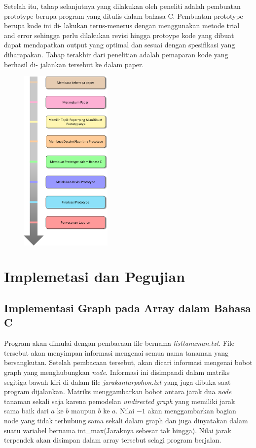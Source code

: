 \documentclass[conference]{IEEEtran}
\begin{document}
Setelah itu, tahap selanjutnya yang dilakukan oleh peneliti
adalah pembuatan prototype berupa program yang ditulis
dalam bahasa C. Pembuatan prototype berupa kode ini di-
lakukan terus-menerus dengan menggunakan metode trial and
error sehingga perlu dilakukan revisi hingga protoype kode
yang dibuat dapat mendapatkan output yang optimal dan
sesuai dengan spesifikasi yang diharapakan. Tahap terakhir
dari penelitian adalah pemaparan kode yang berhasil di-
jalankan tersebut ke dalam paper.
\begin{figure}[htbp]
\includegraphics[width=0.4\textwidth]{gambar1}
\centering
\end{figure}


\section{Implemetasi dan Pegujian}
\subsection{Implementasi Graph pada Array dalam Bahasa C}
Program akan dimulai dengan pembacaan file bernama \textit{listtanaman.txt}. File tersebut akan menyimpan
informasi mengenai semua nama tanaman yang bersangkutan. Setelah pembacaan tersebut,
akan dicari informasi mengenai bobot graph yang menghubungkan \textit{node}. Informasi ini disimpandi dalam
matriks segitiga bawah kiri di dalam file \textit{jarakantarpohon.txt} yang juga dibuka saat program dijalankan.
Matriks menggambarkan bobot antara jarak dua \textit{node} tanaman sekali saja karena pemodelan \textit{undirected graph}
yang memiliki jarak sama baik dari $a$ ke $b$ maupun $b$ ke $a$. Nilai $-1$ akan menggambarkan bagian node yang tidak terhubung
sama sekali dalam graph dan juga dinyatakan dalam suatu variabel bernama int\_max(Jaraknya sebesar tak hingga). Nilai jarak terpendek
akan disimpan dalam array tersebut selagi program berjalan.
\end{document}
